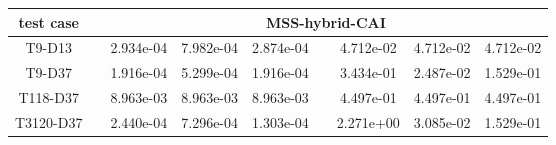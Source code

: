 \begin{table}
\begin{adjustbox}{width=1\textwidth} %
\small
\begin{tabular}{ccccccccc}
\toprule
{test case} && \multicolumn{7}{c}{MSS-hybrid-CAI}   \\
\midrule
T9-D13       &&  2.934e-04 &  7.982e-04 &  2.874e-04 &&  4.712e-02 &  4.712e-02 &  4.712e-02 \\
T9-D37       &&  1.916e-04 &  5.299e-04 &  1.916e-04 &&  3.434e-01 &  2.487e-02 &  1.529e-01 \\
T118-D37     &&  8.963e-03 &  8.963e-03 &  8.963e-03 &&  4.497e-01 &  4.497e-01 &  4.497e-01 \\
T3120-D37    &&  2.440e-04 &  7.296e-04 &  1.303e-04 &&  2.271e+00 &  3.085e-02 &  1.529e-01 \\
\bottomrule
\end{tabular}
\end{adjustbox}


\end{table}

